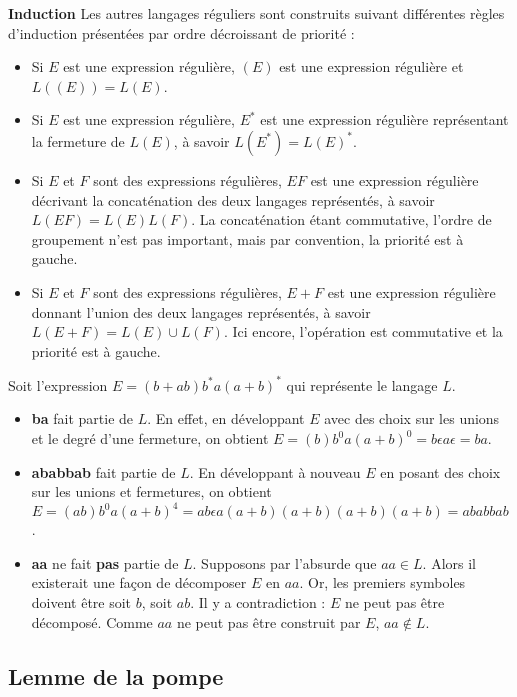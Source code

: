\textbf{Induction}
Les autres langages réguliers sont construits suivant différentes règles d'induction présentées par ordre décroissant de priorité :

\begin{itemize}
	\item Si $E$ est une expression régulière, $(E)$ est une expression régulière et $L((E)) = L(E)$.
	\item Si $E$ est une expression régulière, $E^*$ est une expression régulière représentant la fermeture de $L(E)$, à savoir $L(E^*) = L(E)^*$.
	\item Si $E$ et $F$ sont des expressions régulières, $EF$ est une expression régulière décrivant la concaténation des deux langages représentés, à savoir $L(EF)=L(E)L(F)$. La concaténation étant commutative, l'ordre de groupement n'est pas important, mais par convention, la priorité est à gauche.
	\item Si $E$ et $F$ sont des expressions régulières, $E+F$ est une expression régulière donnant l'union des deux langages représentés, à savoir $L(E+F)=L(E)\cup L(F)$. Ici encore, l'opération est commutative et la priorité est à gauche.
\end{itemize}

\begin{example}
	Soit l'expression $E = (b+ab)b^*a(a+b)^*$ qui représente le langage $L$.\\
	\begin{itemize}
		\item \textbf{ba} fait partie de $L$. En effet, en développant $E$ avec des choix sur les unions et le degré d'une fermeture, on obtient  $E= (b)b^0a(a+b)^0 = b\epsilon a \epsilon = ba$.
		\item \textbf{ababbab} fait partie de $L$. En développant à nouveau $E$ en posant des choix sur les unions et fermetures, on obtient $E=(ab)b^0a(a+b)^4 = ab\epsilon a (a+b)(a+b)(a+b)(a+b) = ababbab$.
		\item \textbf{aa} ne fait \textbf{pas} partie de $L$. Supposons par l'absurde que $aa \in L$. Alors il existerait une façon de décomposer $E$ en $aa$. Or, les premiers symboles doivent être soit $b$, soit $ab$. Il y a contradiction : $E$ ne peut pas être décomposé. Comme $aa$ ne peut pas être construit par $E$, $aa \notin L$.
	\end{itemize}
	\label{ex:regex}
\end{example}



\subsection{Lemme de la pompe}
